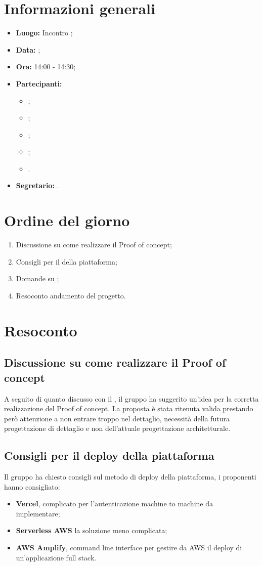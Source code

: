 \section{Informazioni generali}
\begin{itemize}
\item \textbf{Luogo:} Incontro ;
\item \textbf{Data:} \Data;
\item \textbf{Ora:} 14:00 - 14:30;
\item \textbf{Partecipanti:}
	\begin{itemize}
		\item \BL{}; 
		\item \FF{};
		\item \TG{};
		\item \TL{};
		\item \Proponente{}.
	\end{itemize}
\item \textbf{Segretario:} \TG{}.
\end{itemize}

\section{Ordine del giorno}
\begin{enumerate}
	\item Discussione su come realizzare il Proof of concept;
	\item Consigli per il  della piattaforma;
	\item Domande su ;
	\item Resoconto andamento del progetto.
\end{enumerate}

\section{Resoconto}
\subsection{Discussione su come realizzare il Proof of concept}
A seguito di quanto discusso con il \CR{}, il gruppo ha suggerito un'idea per la corretta realizzazione del Proof of concept. La proposta è stata ritenuta valida prestando però attenzione a non entrare troppo nel dettaglio, necessità della futura progettazione di dettaglio e non dell'attuale progettazione architetturale.
\subsection{Consigli per il deploy della piattaforma}
Il gruppo ha chiesto consigli sul metodo di deploy della piattaforma, i proponenti hanno consigliato:
\begin{itemize}
	\item \textbf{Vercel}, complicato per l'autenticazione machine to machine da implementare;
	\item \textbf{Serverless AWS} la soluzione meno complicata;
	\item \textbf{AWS Amplify}, command line interface per gestire da AWS il deploy di un'applicazione full stack.
\end{itemize}
